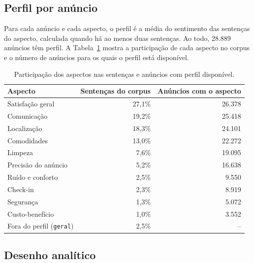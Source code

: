 \subsection{Perfil por anúncio}

Para cada anúncio e cada aspecto, o perfil é a média do sentimento das sentenças do aspecto, calculada quando há ao menos duas sentenças. Ao todo, 28.889 anúncios têm perfil. A Tabela~\ref{tab:aspectos} mostra a participação de cada aspecto no corpus e o número de anúncios para os quais o perfil está disponível.

\begin{table}[htb]
\centering
\caption{Participação dos aspectos nas sentenças e anúncios com perfil disponível.}
\small
\begin{tabular}{l|r|r}
\hline
Aspecto & Sentenças do corpus & Anúncios com o aspecto\\
\hline
Satisfação geral & 27,1\% & 26.378\\
Comunicação & 19,2\% & 25.418\\
Localização & 18,3\% & 24.101\\
Comodidades & 13,0\% & 22.272\\
Limpeza & 7,6\% & 19.095\\
Precisão do anúncio & 5,2\% & 16.638\\
Ruído e conforto & 2,5\% & 9.550\\
Check-in & 2,3\% & 8.919\\
Segurança & 1,3\% & 5.072\\
Custo-benefício & 1,0\% & 3.552\\
Fora do perfil (\texttt{geral}) & 2,5\% & --\\
\hline
\end{tabular}
\label{tab:aspectos}
\end{table}

\subsection{Desenho analítico}

